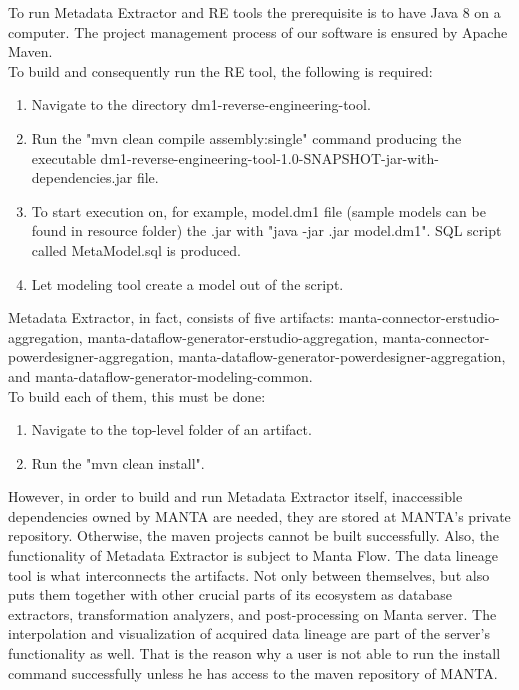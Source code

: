 \documentclass[12pt,a4paper]{report}
\begin{document}
To run Metadata Extractor and RE tools the prerequisite is to have Java 8 on a computer. The project management process of our software is ensured by Apache Maven. \\

To build and consequently run the RE tool, the following is required:
\begin{enumerate}
	\item Navigate to the directory dm1-reverse-engineering-tool.
	\item Run the "mvn clean compile assembly:single" command producing the executable dm1-reverse-engineering-tool-1.0-SNAPSHOT-jar-with-dependencies.jar file.
	\item To start execution on, for example, model.dm1 file (sample models can be found in resource folder) the .jar with "java -jar .jar model.dm1". SQL script called MetaModel.sql is produced.
	\item Let modeling tool create a model out of the script.
\end{enumerate}

Metadata Extractor, in fact, consists of five artifacts: manta-connector-erstudio-aggregation, manta-dataflow-generator-erstudio-aggregation, manta-connector-powerdesigner-aggregation, manta-dataflow-generator-powerdesigner-aggregation, and manta-dataflow-generator-modeling-common. \\
To build each of them, this must be done:
\begin{enumerate}
	\item Navigate to the top-level folder of an artifact.
	\item Run the "mvn clean install".
\end{enumerate}

However, in order to build and run Metadata Extractor itself, inaccessible dependencies owned by MANTA are needed, they are stored at MANTA's private repository. Otherwise, the maven projects cannot be built successfully.
Also, the functionality of Metadata Extractor is subject to Manta Flow. The data lineage tool is what interconnects the artifacts. 
Not only between themselves, but also puts them together with other crucial parts of its ecosystem as database extractors, transformation analyzers, and post-processing on Manta server. 
The interpolation and visualization of acquired data lineage are part of the server's functionality as well.
That is the reason why a user is not able to run the install command successfully unless he has access to the maven repository of MANTA. \\
\end{document}
